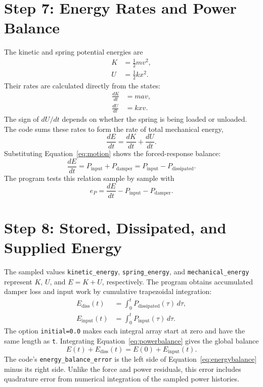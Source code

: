 \documentclass[11pt]{article}
\begin{document}
\section{Step 7: Energy Rates and Power Balance}
The kinetic and spring potential energies are
\begin{align}
K&=\frac{1}{2}mv^2,\\
U&=\frac{1}{2}kx^2.
\end{align}
Their rates are calculated directly from the states:
\begin{align}
\frac{dK}{dt}&=mav,\\
\frac{dU}{dt}&=kxv.
\end{align}
The sign of $dU/dt$ depends on whether the spring is being loaded or unloaded. The code sums these rates to form the rate of total mechanical energy,
\begin{equation}
\frac{dE}{dt}=\frac{dK}{dt}+\frac{dU}{dt}.
\end{equation}
Substituting Equation~\ref{eq:motion} shows the forced-response balance:
\begin{equation}
\frac{dE}{dt}=P_{\mathrm{input}}+P_{\mathrm{damper}}
=P_{\mathrm{input}}-P_{\mathrm{dissipated}}.
\label{eq:powerbalance}
\end{equation}
The program tests this relation sample by sample with
\begin{equation}
e_P=\frac{dE}{dt}-P_{\mathrm{input}}-P_{\mathrm{damper}}.
\end{equation}

\section{Step 8: Stored, Dissipated, and Supplied Energy}
The sampled values \texttt{kinetic\_energy}, \texttt{spring\_energy}, and \texttt{mechanical\_energy} represent $K$, $U$, and $E=K+U$, respectively. The program obtains accumulated damper loss and input work by cumulative trapezoidal integration:
\begin{align}
E_{\mathrm{diss}}(t)&=\int_0^t P_{\mathrm{dissipated}}(\tau)\,d\tau,\\
E_{\mathrm{input}}(t)&=\int_0^t P_{\mathrm{input}}(\tau)\,d\tau.
\end{align}
The option \texttt{initial=0.0} makes each integral array start at zero and have the same length as \texttt{t}. Integrating Equation~\ref{eq:powerbalance} gives the global balance
\begin{equation}
E(t)+E_{\mathrm{diss}}(t)=E(0)+E_{\mathrm{input}}(t).
\label{eq:energybalance}
\end{equation}
The code's \texttt{energy\_balance\_error} is the left side of Equation~\ref{eq:energybalance} minus its right side. Unlike the force and power residuals, this error includes quadrature error from numerical integration of the sampled power histories.
\end{document}
